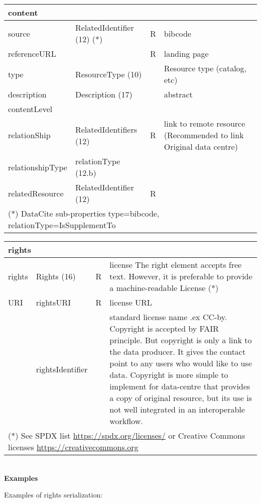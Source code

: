 \documentclass[11pt,a4paper]{ivoa}
\begin{document}
\begin{tabular}{|p{3cm}|p{4cm}|p{1cm}|p{5cm}|} \hline
\multicolumn{4}{|l|}{\textbf{content} } \\ \hline
source        & RelatedIdentifier (12) (*) & R & bibcode\\ \hline
referenceURL  & & R & landing page\\ \hline
type          & ResourceType (10)& & Resource type (catalog, etc)\\ \hline
description   & Description (17)& & abstract\\ \hline
contentLevel  & & &\\ \hline
relationShip  & RelatedIdentifiers (12) & R &link to remote resource (Recommended to link Original data centre) \\ \hline
relationshipType & relationType (12.b) & &\\ \hline
relatedResource  & RelatedIdentifier (12) & R &\\ \hline
\multicolumn{4}{l}{\small \footnotesize(*) DataCite sub-properties type=bibcode, relationType=IsSupplementTo} \\
\end{tabular}

\begin{tabular}{|p{3cm}|p{4cm}|p{1cm}|p{5cm}|} \hline
\multicolumn{4}{l}{\textbf{rights}} \\ \hline
rights   & Rights (16)& R& license
          The right element accepts free text. However, it is preferable to provide a machine-readable License (*)
         \\ \hline
URI     & rightsURI & R& license URL\\ \hline
         & rightsIdentifier & & standard license name .ex CC-by.
         Copyright is accepted by FAIR principle. But copyright is only a link to the data producer. It gives the contact point to any users who would like to use data. Copyright is more simple to implement for data-centre that provides a copy of original resource, but its use is not well integrated in an interoperable workflow.
         \\ \hline
\multicolumn{4}{p{\textwidth}}{\small \footnotesize(*) See SPDX list \url{https://spdx.org/licenses/} or Creative Commons licenses \url{https://creativecommons.org}}
\end{tabular}\\




\textbf{Examples}

Examples of rights serialization:
\end{document}
